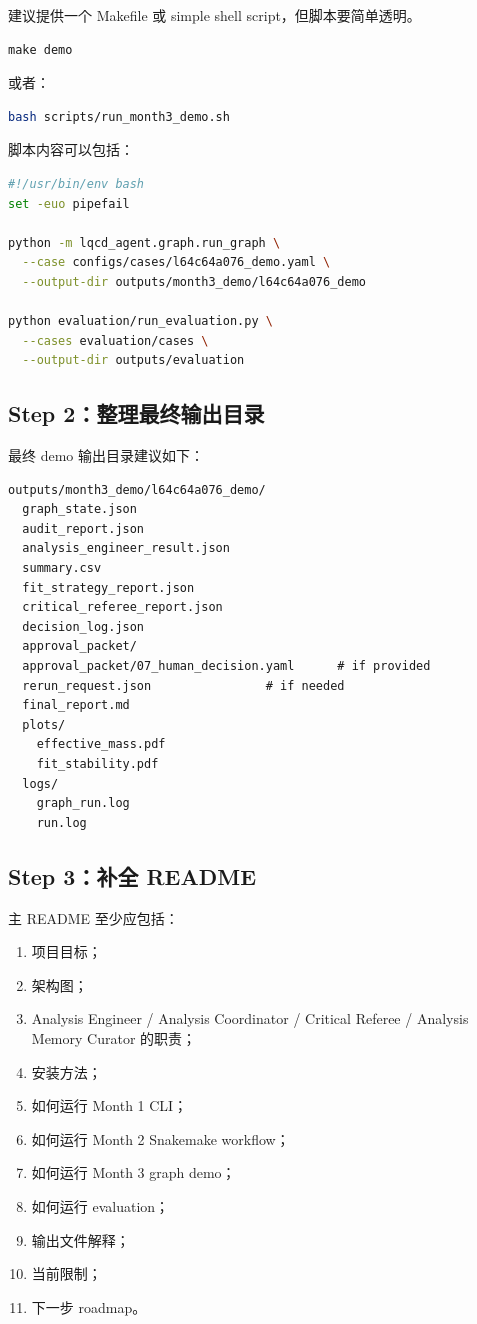 \documentclass[11pt,a4paper,fontset=none]{ctexart}
\begin{document}
建议提供一个 Makefile 或 simple shell script，但脚本要简单透明。

\begin{lstlisting}
make demo
\end{lstlisting}

或者：

\begin{lstlisting}[language=bash]
bash scripts/run_month3_demo.sh
\end{lstlisting}

脚本内容可以包括：

\begin{lstlisting}[language=bash]
#!/usr/bin/env bash
set -euo pipefail

python -m lqcd_agent.graph.run_graph \
  --case configs/cases/l64c64a076_demo.yaml \
  --output-dir outputs/month3_demo/l64c64a076_demo

python evaluation/run_evaluation.py \
  --cases evaluation/cases \
  --output-dir outputs/evaluation
\end{lstlisting}

\subsection{Step 2：整理最终输出目录}

最终 demo 输出目录建议如下：

\begin{lstlisting}
outputs/month3_demo/l64c64a076_demo/
  graph_state.json
  audit_report.json
  analysis_engineer_result.json
  summary.csv
  fit_strategy_report.json
  critical_referee_report.json
  decision_log.json
  approval_packet/
  approval_packet/07_human_decision.yaml      # if provided
  rerun_request.json                # if needed
  final_report.md
  plots/
    effective_mass.pdf
    fit_stability.pdf
  logs/
    graph_run.log
    run.log
\end{lstlisting}

\subsection{Step 3：补全 README}

主 README 至少应包括：

\begin{enumerate}[leftmargin=2em]
  \item 项目目标；
  \item 架构图；
  \item Analysis Engineer / Analysis Coordinator / Critical Referee / Analysis Memory Curator 的职责；
  \item 安装方法；
  \item 如何运行 Month 1 CLI；
  \item 如何运行 Month 2 Snakemake workflow；
  \item 如何运行 Month 3 graph demo；
  \item 如何运行 evaluation；
  \item 输出文件解释；
  \item 当前限制；
  \item 下一步 roadmap。
\end{enumerate}
\end{document}
